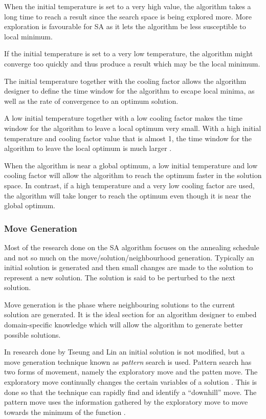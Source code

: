 When the initial temperature is set to a very high value, the algorithm takes a long time to reach a result since the search space is being explored more\cite{SALongestCommon,VariousCoolingSA}. More exploration is favourable for SA as it lets the algorithm be less susceptible to local minimum. 

If the initial temperature is set to a very low temperature, the algorithm might converge too quickly and thus produce a result which may be the local minimum\cite{SALongestCommon,VariousCoolingSA,AutoConfigSA}.

The initial temperature together with the cooling factor allows the algorithm designer to define the time window for the algorithm to escape local minima, as well as the rate of convergence to an optimum solution\cite{SALongestCommon,VariousCoolingSA}.

A low initial temperature together with a low cooling factor makes the time window for the algorithm to leave a local optimum very small\cite{SALongestCommon}. With a high initial temperature and cooling factor value that is almost 1, the time window for the algorithm to leave the local optimum is much larger \cite{SALongestCommon}. 

When the algorithm is near a global optimum, a low initial temperature and low cooling factor will allow the algorithm to reach the optimum faster in the solution space\cite{SALongestCommon}. In contrast, if a high temperature and a very low cooling factor are used, the algorithm will take longer to reach the optimum even though it is near the global optimum\cite{SALongestCommon}.

\subsubsection{Move Generation}
Most of the research done on the SA algorithm focuses on the annealing schedule and not so much on the move/solution/neighbourhood generation. Typically an initial solution is generated and then small changes are made to the solution to represent a new solution. The solution is said to be perturbed to the next solution.

Move generation is the phase where neighbouring solutions to the current solution are generated. It is the ideal section for an algorithm designer to embed domain-specific knowledge which will allow the algorithm to generate better possible solutions.

In research done by Tseung and Lin \cite{CurveFittingSA} an initial solution is not modified, but a move generation technique known as \emph{pattern} search is used. Pattern search has two forms of movement, namely the exploratory move and the patten move. The exploratory move continually changes the certain variables of a solution \cite{CurveFittingSA}. This is done so that the technique can rapidly find and identify a ``downhill'' move. The pattern move uses the information gathered by the exploratory move to move towards the minimum of the function \cite{CurveFittingSA}.
